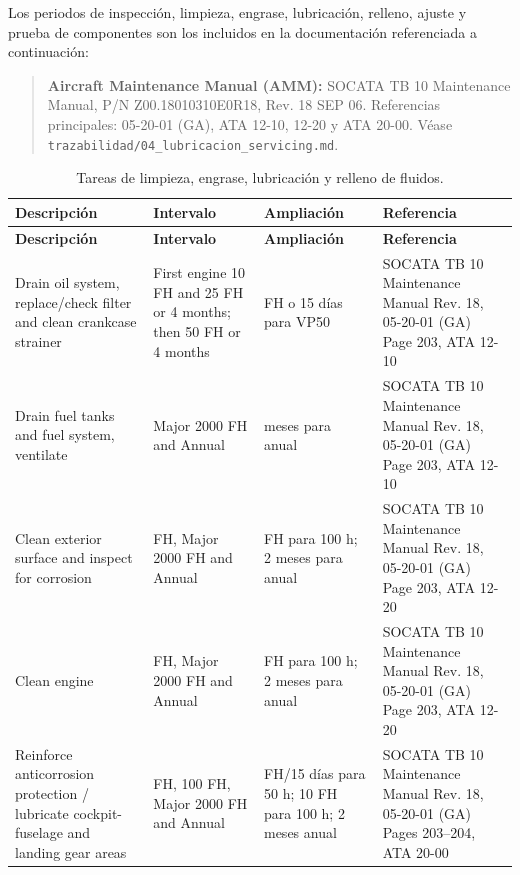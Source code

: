 \documentclass[12pt]{article}
\newcommand{\FH}{FH}
\begin{document}
Los periodos de inspección, limpieza, engrase, lubricación, relleno, ajuste y prueba de componentes son los incluidos en la documentación referenciada a continuación:

\begin{quote}
\raggedright
\textbf{Aircraft Maintenance Manual (AMM):} SOCATA TB 10 Maintenance Manual, P/N Z00.18010310E0R18, Rev. 18 SEP 06. Referencias principales: 05-20-01 (GA), ATA 12-10, 12-20 y ATA 20-00. Véase \texttt{trazabilidad/04\_lubricacion\_servicing.md}.
\end{quote}

\begingroup
\scriptsize
\setlength{\tabcolsep}{3pt}
\renewcommand{\arraystretch}{1.18}
\begin{longtable}{|>{\raggedright\arraybackslash}p{}|>{\raggedright\arraybackslash}p{}|>{\raggedright\arraybackslash}p{}|>{\raggedright\arraybackslash}p{}|}
\caption{Tareas de limpieza, engrase, lubricación y relleno de fluidos.}
\label{tab:servicing}\\
\hline
\textbf{Descripción} & \textbf{Intervalo} & \textbf{Ampliación} & \textbf{Referencia} \\
\hline
\endfirsthead
\hline
\textbf{Descripción} & \textbf{Intervalo} & \textbf{Ampliación} & \textbf{Referencia} \\
\hline
\endhead
Drain oil system, replace/check filter and clean crankcase strainer & First engine 10 \FH{} and 25 \FH{} or 4 months; then 50 \FH{} or 4 months & 5 \FH{} o 15 días para VP50 & SOCATA TB 10 Maintenance Manual Rev. 18, 05-20-01 (GA) Page 203, ATA 12-10 \\
\hline
Drain fuel tanks and fuel system, ventilate & Major 2000 \FH{} and Annual & 2 meses para anual & SOCATA TB 10 Maintenance Manual Rev. 18, 05-20-01 (GA) Page 203, ATA 12-10 \\
\hline
Clean exterior surface and inspect for corrosion & 100 \FH, Major 2000 \FH{} and Annual & 10 \FH{} para 100 h; 2 meses para anual & SOCATA TB 10 Maintenance Manual Rev. 18, 05-20-01 (GA) Page 203, ATA 12-20 \\
\hline
Clean engine & 100 \FH, Major 2000 \FH{} and Annual & 10 \FH{} para 100 h; 2 meses para anual & SOCATA TB 10 Maintenance Manual Rev. 18, 05-20-01 (GA) Page 203, ATA 12-20 \\
\hline
Reinforce anticorrosion protection / lubricate cockpit-fuselage and landing gear areas & 50 \FH, 100 \FH, Major 2000 \FH{} and Annual & 5 \FH/15 días para 50 h; 10 \FH{} para 100 h; 2 meses anual & SOCATA TB 10 Maintenance Manual Rev. 18, 05-20-01 (GA) Pages 203--204, ATA 20-00 \\

\end{longtable}
\end{document}
